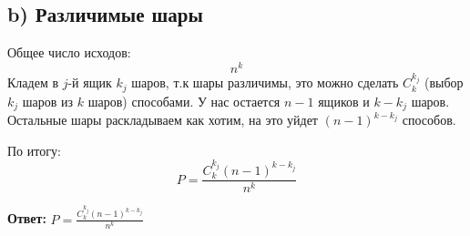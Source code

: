 \documentclass[a4paper,12pt]{article}
\begin{document}
\subsection*{b) Различимые шары}
Общее число исходов:
\[
n^k
\]
Кладем в $j$-й ящик $k_j$ шаров, т.к шары различимы, это можно сделать $C_k^{k_j}$ (выбор $k_j$ шаров из $k$ шаров) способами. У нас остается $n - 1$ ящиков и $k - k_j$ шаров. Остальные шары раскладываем как хотим, на это уйдет $(n - 1)^{k - k_j}$ способов.

По итогу:
\[
P = \frac{C_k^{k_j} (n - 1)^{k - k_j}}{n^k}
\]
\begin{center}
\textbf{Ответ: } $P =  \frac{C_k^{k_j} (n - 1)^{k - k_j}}{n^k}$
\end{center}
\end{document}
